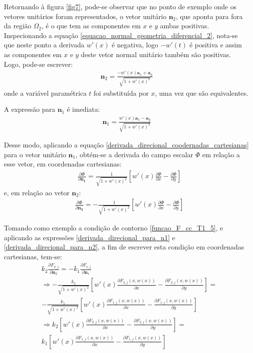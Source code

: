 Retornando à figura \ref{fig7}, pode-se observar que no ponto de exemplo onde os vetores unitários foram representados, o vetor unitário $\mathbf{n}_2$,
que aponta para fora da região $\Omega_2$, é o que tem as componentes em $x$ e $y$ ambas positivas. Inspecionando a equação \eqref{equacao_normal_geometria_diferencial_2},
nota-se que neste ponto a derivada $w'(x)$ é negativa, logo $-w'(t)$ é positiva e assim as componentes em $x$ e $y$ deste vetor normal unitário também são positivas. Logo, 
pode-se escrever:
\begin{align}
	\mathbf{n}_2 = \frac{ -w'(x)\mathbf{a}_x + \mathbf{a}_y }{\sqrt{ 1 + w'(x)^2 }}
\end{align}
onde a variável paramétrica $t$ foi substituída por $x$, uma vez que são equivalentes.
 
A expressão para $\mathbf{n}_1$ é imediata:
\begin{align}
	\mathbf{n}_1 = \frac{ w'(x)\mathbf{a}_x - \mathbf{a}_y }{\sqrt{ 1 + w'(x)^2 }}
\end{align}

Desse modo, aplicando a equação \eqref{derivada_direcional_coodernadas_cartesianas} para o vetor unitário $\mathbf{n}_1$, obtém-se a derivada do campo escalar $\Phi$
em relação a esse vetor, em coordenadas cartesianas: 
\begin{align}
	& \frac{\partial\Phi}{\partial\mathbf{n_1}} = \frac{1}{\sqrt{1 + w'(x)^2}}\left[w'(x)\frac{\partial \Phi}{\partial x} - \frac{\partial \Phi}{\partial y}\right]
	\label{derivada_direcional_para_n1}
\end{align} 
e, em relação ao vetor $\mathbf{n}_2$:
\begin{align}
	& \frac{\partial\Phi}{\partial\mathbf{n_2}} = -\frac{1}{\sqrt{1 + w'(x)^2}}\left[w'(x)\frac{\partial \Phi}{\partial x} - \frac{\partial \Phi}{\partial y}\right]
	\label{derivada_direcional_para_n2}
\end{align} 

Tomando como exemplo a condição de contorno \eqref{funcao_F_cc_T1_5}, e aplicando as expressões \eqref{derivada_direcional_para_n1} e \eqref{derivada_direcional_para_n2},
a fim de escrever esta condição em coordenadas cartesianas,
tem-se:
\begin{align}
	& k_2\frac{\partial F_{2, j}}{\partial\mathbf{n}_2} = - k_1\frac{\partial F_{1,j}}{\partial\mathbf{n}_1} \nonumber \\
	& \Rightarrow -\frac{k_2}{\sqrt{1 + w'(x)^2}}\left[w'(x)\frac{\partial F_{2,j}(x, w(x))}{\partial x} - \frac{\partial F_{2,j}(x, w(x))}{\partial y}\right] = \nonumber \\
	& -\frac{k_1}{\sqrt{1 + w'(x)^2}}\left[w'(x)\frac{\partial F_{1,j}(x, w(x))}{\partial x} - \frac{\partial F_{1,j}(x, w(x))}{\partial y}\right] \nonumber \\
	& \Rightarrow k_2\left[w'(x)\frac{\partial F_{2,j}(x, w(x))}{\partial x} - \frac{\partial F_{2,j}(x, w(x))}{\partial y}\right] = \nonumber \\
	& k_1 \left[w'(x)\frac{\partial F_{1,j}(x, w(x))}{\partial x} - \frac{\partial F_{1,j}(x, w(x))}{\partial y}\right]
\end{align}

